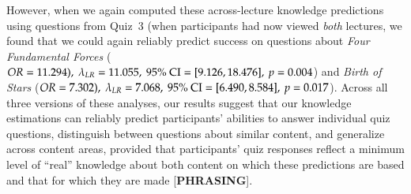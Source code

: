 \documentclass[10pt]{article}
\begin{document}
However, when we again computed these across-lecture knowledge predictions using questions from Quiz~3 (when participants had now viewed \textit{both} lectures, we found that we could again reliably predict success on questions about \textit{Four Fundamental Forces} ($OR = 11.294),\ \lambda_{LR} = 11.055,\ 95\%\ \textnormal{CI} = [9.126, 18.476],\ p = 0.004$) and \textit{Birth of Stars} ($OR = 7.302),\ \lambda_{LR} = 7.068,\ 95\%\ \textnormal{CI} = [6.490, 8.584],\ p = 0.017$).
Across all three versions of these analyses, our results suggest that our knowledge estimations can reliably predict participants' abilities to answer individual quiz questions, distinguish between questions about similar content, and generalize across content areas, provided that participants' quiz responses reflect a minimum level of ``real'' knowledge about both content on which these predictions are based and that for which they are made [\textbf{PHRASING}].


\end{document}
